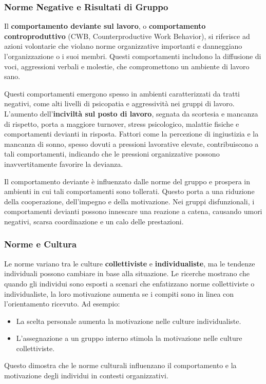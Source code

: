 \documentclass{article}
\begin{document}
\subsubsection{Norme Negative e Risultati di Gruppo}

Il \textbf{comportamento deviante sul lavoro}, o \textbf{comportamento controproduttivo} (CWB, Counterproductive Work Behavior), si riferisce ad azioni volontarie che violano norme organizzative importanti e danneggiano l'organizzazione o i suoi membri. Questi comportamenti includono la diffusione di voci, aggressioni verbali e molestie, che compromettono un ambiente di lavoro sano.

Questi comportamenti emergono spesso in ambienti caratterizzati da tratti negativi, come alti livelli di psicopatia e aggressività nei gruppi di lavoro. L'aumento dell'\textbf{inciviltà sul posto di lavoro}, segnata da scortesia e mancanza di rispetto, porta a maggiore turnover, stress psicologico, malattie fisiche e comportamenti devianti in risposta. Fattori come la percezione di ingiustizia e la mancanza di sonno, spesso dovuti a pressioni lavorative elevate, contribuiscono a tali comportamenti, indicando che le pressioni organizzative possono inavvertitamente favorire la devianza.

Il comportamento deviante è influenzato dalle norme del gruppo e prospera in ambienti in cui tali comportamenti sono tollerati. Questo porta a una riduzione della cooperazione, dell'impegno e della motivazione. Nei gruppi disfunzionali, i comportamenti devianti possono innescare una reazione a catena, causando umori negativi, scarsa coordinazione e un calo delle prestazioni.

\subsubsection{Norme e Cultura}

Le norme variano tra le culture \textbf{collettiviste} e \textbf{individualiste}, ma le tendenze individuali possono cambiare in base alla situazione. Le ricerche mostrano che quando gli individui sono esposti a scenari che enfatizzano norme collettiviste o individualiste, la loro motivazione aumenta se i compiti sono in linea con l'orientamento ricevuto. Ad esempio:
\begin{itemize}
    \item La scelta personale aumenta la motivazione nelle culture individualiste.
    \item L'assegnazione a un gruppo interno stimola la motivazione nelle culture collettiviste.
\end{itemize}
Questo dimostra che le norme culturali influenzano il comportamento e la motivazione degli individui in contesti organizzativi.
\end{document}
